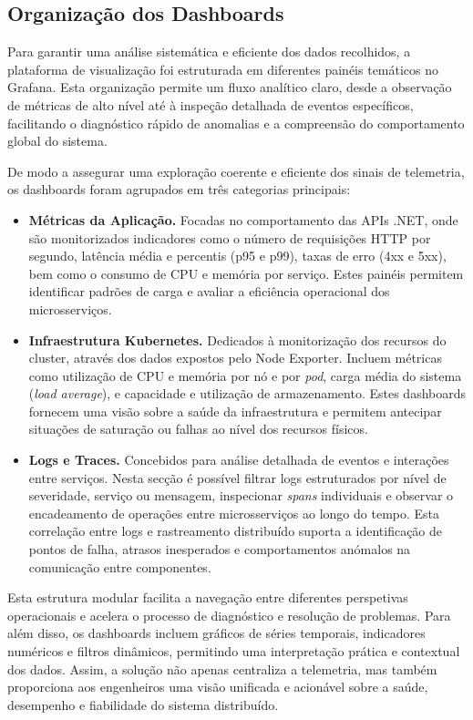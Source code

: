 \subsection{Organização dos Dashboards}

Para garantir uma análise sistemática e eficiente dos dados recolhidos, a plataforma de visualização foi estruturada em diferentes painéis temáticos no Grafana. Esta organização permite um fluxo analítico claro, desde a observação de métricas de alto nível até à inspeção detalhada de eventos específicos, facilitando o diagnóstico rápido de anomalias e a compreensão do comportamento global do sistema.

De modo a assegurar uma exploração coerente e eficiente dos sinais de telemetria, os dashboards foram agrupados em três categorias principais:

\begin{itemize}
    \item \textbf{Métricas da Aplicação.} Focadas no comportamento das APIs .NET, onde são monitorizados indicadores como o número de requisições HTTP por segundo, latência média e percentis (p95 e p99), taxas de erro (4xx e 5xx), bem como o consumo de CPU e memória por serviço. Estes painéis permitem identificar padrões de carga e avaliar a eficiência operacional dos microsserviços.
    
    \item \textbf{Infraestrutura Kubernetes.} Dedicados à monitorização dos recursos do cluster, através dos dados expostos pelo Node Exporter. Incluem métricas como utilização de CPU e memória por nó e por \textit{pod}, carga média do sistema (\textit{load average}), e capacidade e utilização de armazenamento. Estes dashboards fornecem uma visão sobre a saúde da infraestrutura e permitem antecipar situações de saturação ou falhas ao nível dos recursos físicos.
    
    \item \textbf{Logs e Traces.} Concebidos para análise detalhada de eventos e interações entre serviços. Nesta secção é possível filtrar logs estruturados por nível de severidade, serviço ou mensagem, inspecionar \textit{spans} individuais e observar o encadeamento de operações entre microsserviços ao longo do tempo. Esta correlação entre logs e rastreamento distribuído suporta a identificação de pontos de falha, atrasos inesperados e comportamentos anómalos na comunicação entre componentes.
\end{itemize}

Esta estrutura modular facilita a navegação entre diferentes perspetivas operacionais e acelera o processo de diagnóstico e resolução de problemas. Para além disso, os dashboards incluem gráficos de séries temporais, indicadores numéricos e filtros dinâmicos, permitindo uma interpretação prática e contextual dos dados. Assim, a solução não apenas centraliza a telemetria, mas também proporciona aos engenheiros uma visão unificada e acionável sobre a saúde, desempenho e fiabilidade do sistema distribuído.

